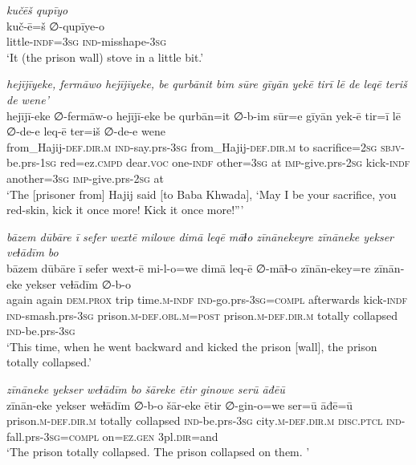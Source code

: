\ea \label{BP.171}
\textit{kučēš qupīyo} \\ 
\gll kuč-ē=š ∅-qupīye-o \\ 
 little\textsc{-indf}\textsc{=3sg} \textsc{ind-}misshape\textsc{-3sg} \\ 
\glt `It (the prison wall) stove in a little bit.'
\z 
 
\ea \label{BP.172}
\textit{hejījīyeke, fermāwo hejījīyeke, be qurbānit bim sūre gīyān yekē tirī lē de leqē teriš de wene’} \\ 
\gll hejījī-eke ∅-fermāw-o hejījī-eke be qurbān=it ∅-b-im sūr=e gīyān yek-ē tir=ī lē ∅-de-e leq-ē ter=iš ∅-de-e wene \\ 
 from\_Hajij\textsc{-def}\textsc{.dir}\textsc{.m} \textsc{ind-}say.prs\textsc{-3sg} from\_Hajij\textsc{-def}\textsc{.dir}\textsc{.m} to sacrifice\textsc{=\textsc{2sg}} \textsc{sbjv-}be.prs\textsc{-\textsc{1sg}} red=ez\textsc{.cmpd} dear.\textsc{voc} one\textsc{-indf} other\textsc{=3sg} at \textsc{imp-}give.prs-\textsc{2sg} kick\textsc{-indf} another\textsc{=3sg} \textsc{imp-}give.prs-\textsc{2sg} at \\ 
\glt `The [prisoner from] Hajij said [to Baba Khwada], ‘May I be your sacrifice, you red-skin, kick it once more! Kick it once more!”'
\z 
 
\ea \label{BP.173}
\textit{bāzem dūbāre ī sefer wextē milowe dimā leqē māɫo zīnānekeyre zīnāneke yekser veɫādīm bo} \\ 
\gll bāzem dūbāre ī sefer wext-ē mi-l-o=we dimā leq-ē ∅-māɫ-o zīnān-ekey=re zīnān-eke yekser veɫādīm ∅-b-o \\ 
 again again \textsc{dem.prox} trip time\textsc{.m}\textsc{-indf} \textsc{ind-}go.prs\textsc{-3sg}\textsc{=compl} afterwards kick\textsc{-indf} \textsc{ind-}smash.prs\textsc{-3sg} prison\textsc{.m}\textsc{-def}\textsc{.obl}\textsc{.m}\textsc{=\textsc{post}} prison\textsc{.m}\textsc{-def}\textsc{.dir}\textsc{.m} totally collapsed \textsc{ind-}be.prs\textsc{-3sg} \\ 
\glt `This time, when he went backward and kicked the prison [wall], the prison totally collapsed.'
\z 
 
\ea \label{BP.174}
\textit{zīnāneke yekser weɫādīm bo šāreke ētir ginowe serū āđēū} \\ 
\gll zīnān-eke yekser weɫādīm ∅-b-o šār-eke ētir ∅-gin-o=we ser=ū āđē=ū \\ 
 prison\textsc{.m}\textsc{-def}\textsc{.dir}\textsc{.m} totally collapsed \textsc{ind-}be.prs\textsc{-3sg} city\textsc{.m}\textsc{-def}\textsc{.dir}\textsc{.m} \textsc{disc.ptcl} \textsc{ind-}fall.prs\textsc{-3sg}\textsc{=compl} on\textsc{=ez.gen} 3pl\textsc{.dir}=and \\ 
\glt `The prison totally collapsed. The prison collapsed on them. '
\z 
 
